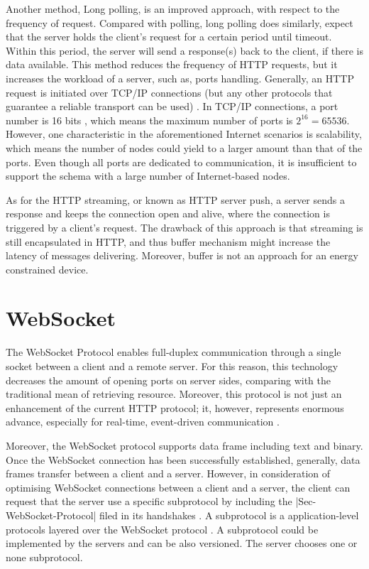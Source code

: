 Another method, Long polling, is an improved approach, with respect to the frequency of request. Compared with polling, long polling does similarly, expect that the server holds the client's request for a certain period until timeout. Within this period, the server will send a response(s) back to the client, if there is data available. This method reduces the frequency of HTTP requests, but it increases the workload of a server, such as, ports handling. Generally, an HTTP request is initiated over TCP/IP connections (but any other protocols that guarantee a reliable transport can be used) \cite {fielding1999hypertext}. In TCP/IP connections, a port number is 16 bits \cite{postel2003rfc}, which means the maximum number of ports is \(  2^{16}  = 65536 \). However, one characteristic in the aforementioned Internet scenarios is scalability, which means the number of nodes could yield to a larger amount than that of the ports. Even though all ports are dedicated to communication, it is insufficient to support the schema with a large number of Internet-based nodes. 

As for the HTTP streaming, or known as HTTP server push, a server sends a response and keeps the connection open and alive, where the connection is triggered by a client's request. The drawback of this approach is that streaming is still encapsulated in HTTP, and thus buffer mechanism might increase the latency of messages delivering. Moreover, buffer is not an approach for an energy constrained device.

\section{WebSocket}
\label{websocket}

The WebSocket Protocol enables full-duplex communication through a single socket between a client and a remote server. For this reason, this technology decreases the amount of opening ports on server sides, comparing with the traditional mean of retrieving resource. Moreover, this protocol is not just an enhancement of the current HTTP protocol; it, however, represents enormous advance, especially for real-time, event-driven communication \cite{lubbers2010html5}.

Moreover, the WebSocket protocol supports data frame including text and binary. Once the WebSocket connection has been successfully established, generally, data frames transfer between a client and a server. However, in consideration of optimising WebSocket connections between a client and a server, the client can request that the server use a specific subprotocol by including the |Sec-WebSocket-Protocol| filed in its handshakes \cite{rfc64552012web}. A subprotocol is a application-level protocols layered over the WebSocket protocol \cite{rfc64552012web}. A subprotocol could be implemented by the servers and can be also versioned. The server chooses one or none subprotocol. 

